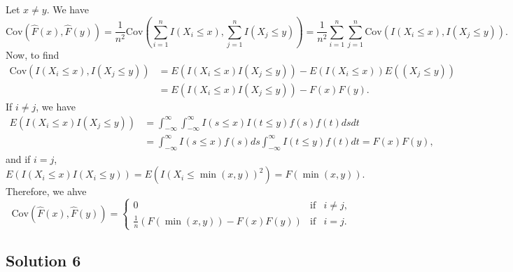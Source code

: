 Let $x \neq y$.
We have
\begin{equation*}
    \mathrm{Cov}(\hat{F}(x), \hat{F}(y))
        = \frac{1}{n^2} \mathrm{Cov}(\sum_{i = 1}^n I(X_i \leq x), \sum_{j = 1}^n I(X_j \leq y))
        = \frac{1}{n^2} \sum_{i = 1}^n \sum_{j = 1}^n \mathrm{Cov}(I(X_i \leq x), I(X_j \leq y)).
\end{equation*}
Now, to find
\begin{equation*}
    \begin{split}
        \mathrm{Cov}(I(X_i \leq x), I(X_j \leq y))
            &= E(I(X_i \leq x) I(X_j \leq y)) - E(I(X_i \leq x)) E((X_j \leq y)) \\
            &= E(I(X_i \leq x) I(X_j \leq y)) - F(x) F(y).
    \end{split}
\end{equation*}
If $i \neq j$, we have
\begin{equation*}
    \begin{split}
        E(I(X_i \leq x) I(X_j \leq y))
            &= \int_{-\infty}^{\infty} \int_{-\infty}^{\infty} I(s \leq x) I(t \leq y) f(s) f(t) ds dt \\
            &= \int_{-\infty}^{\infty} I(s \leq x) f(s) ds \int_{-\infty}^{\infty} I(t \leq y) f(t) dt
            = F(x) F(y),
    \end{split}
\end{equation*}
and if $i = j$,
\begin{equation*}
    E(I(X_i \leq x) I(X_i \leq y))
        = E(I(X_i \leq \min(x, y))^2)
        = F(\min(x, y)).
\end{equation*}
Therefore, we ahve
\begin{equation*}
    \mathrm{Cov}(\hat{F}(x), \hat{F}(y))
        = \left\{
            \begin{array}{lll}
                0 & \text{if} & i \neq j, \\
                \frac{1}{n}(F(\min(x, y)) - F(x)F(y)) & \text{if} & i = j.
            \end{array}
        \right.
\end{equation*}


\subsection*{Solution 6}

